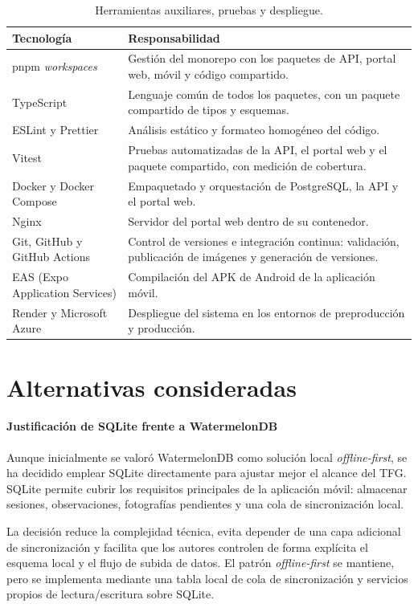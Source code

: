 \begin{table}[H]
  \centering
  \caption{Herramientas auxiliares, pruebas y despliegue.}
  \label{tab:stack_aux}
  \begin{tabularx}{\textwidth}{lX}
    \toprule
    \textbf{Tecnología} & \textbf{Responsabilidad} \\
    \midrule
    pnpm \textit{workspaces} & Gestión del monorepo con los paquetes de API, portal web, móvil y código compartido. \\
    TypeScript & Lenguaje común de todos los paquetes, con un paquete compartido de tipos y esquemas. \\
    ESLint y Prettier & Análisis estático y formateo homogéneo del código. \\
    Vitest & Pruebas automatizadas de la API, el portal web y el paquete compartido, con medición de cobertura. \\
    Docker y Docker Compose & Empaquetado y orquestación de PostgreSQL, la API y el portal web. \\
    Nginx & Servidor del portal web dentro de su contenedor. \\
    Git, GitHub y GitHub Actions & Control de versiones e integración continua: validación, publicación de imágenes y generación de versiones. \\
    EAS (Expo Application Services) & Compilación del APK de Android de la aplicación móvil. \\
    Render y Microsoft Azure & Despliegue del sistema en los entornos de preproducción y producción. \\
    \bottomrule
  \end{tabularx}
\end{table}

\section{Alternativas consideradas}

\paragraph{Justificación de SQLite frente a WatermelonDB}

Aunque inicialmente se valoró WatermelonDB como solución local \textit{offline-first},
se ha decidido emplear SQLite directamente para ajustar mejor el alcance del TFG.
SQLite permite cubrir los requisitos principales de la aplicación móvil: almacenar
sesiones, observaciones, fotografías pendientes y una cola de sincronización local.

La decisión reduce la complejidad técnica, evita depender de una capa adicional de
sincronización y facilita que los autores controlen de forma explícita el esquema
local y el flujo de subida de datos. El patrón \textit{offline-first} se mantiene,
pero se implementa mediante una tabla local de cola de sincronización y servicios
propios de lectura/escritura sobre SQLite.
